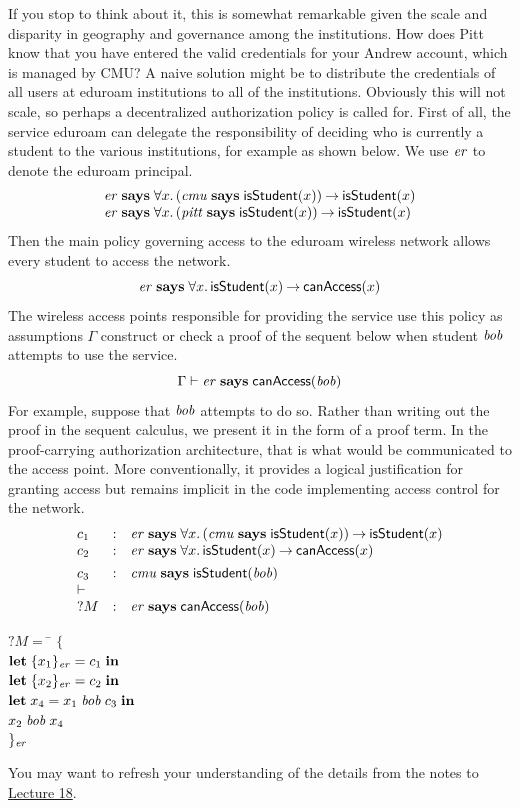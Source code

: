 \documentclass[11pt]{article}
\newcommand{\courseurl}{https://15316-cmu.github.io/2026/}
\begin{document}
If you stop to think about it, this is somewhat remarkable given the scale and
disparity in geography and governance among the institutions. How does Pitt know
that you have entered the valid credentials for your Andrew account, which is
managed by CMU? A naive solution might be to distribute the credentials of
all users at eduroam institutions to all of the institutions. Obviously
this will not scale, so perhaps a decentralized authorization policy is called
for.  First of all, the service eduroam can delegate the responsibility of
deciding who is currently a student to the various institutions, for example as
shown below. We use $\mathit{er}$ to denote the eduroam principal.
\[
  \begin{array}{l}
    \mathit{er} \mathrel{\mathbf{says}} \forall x.\, (\mathit{cmu} \mathrel{\mathbf{says}} \mathsf{isStudent}(x)) \mathbin{\rightarrow} \mathsf{isStudent}(x) \\
    \mathit{er} \mathrel{\mathbf{says}} \forall x.\, (\mathit{pitt} \mathrel{\mathbf{says}} \mathsf{isStudent}(x)) \mathbin{\rightarrow} \mathsf{isStudent}(x)
  \end{array}
\]
Then the main policy governing access to the eduroam wireless network
allows every student to access the network.
\[
  \mathit{er} \mathrel{\mathbf{says}} \forall x.\, \mathsf{isStudent}(x) \mathbin{\rightarrow} \mathsf{canAccess}(x)
\]
The wireless access points responsible for providing the service use this policy
as assumptions $\Gamma$ construct or check a proof of the sequent below when
student $\mathit{bob}$ attempts to use the service.
\[
  \Gamma \vdash \mathit{er} \mathrel{\mathbf{says}} \mathsf{canAccess}(\mathit{bob})
\]
For example, suppose that $\mathit{bob}$ attempts to do so.  Rather than writing
out the proof in the sequent calculus, we present it in the form of a proof term.
In the proof-carrying authorization architecture, that is what would be
communicated to the access point.  More conventionally, it provides a
logical justification for granting access but remains implicit in the code
implementing access control for the network.
\[
  \begin{array}{lcl}
    c_1 & : & \mathit{er} \mathrel{\mathbf{says}} \forall x.\, (\mathit{cmu} \mathrel{\mathbf{says}} \mathsf{isStudent}(x)) \mathbin{\rightarrow} \mathsf{isStudent}(x) \\
    c_2 & : & \mathit{er} \mathrel{\mathbf{says}} \forall x.\, \mathsf{isStudent}(x) \mathbin{\rightarrow} \mathsf{canAccess}(x) \\[1ex]
    c_3 & : & \mathit{cmu} \mathrel{\mathbf{says}} \mathsf{isStudent}(\mathit{bob}) \\
    \vdash \\
    ?M & : & \mathit{er} \mathrel{\mathbf{says}} \mathsf{canAccess}(\mathit{bob})
  \end{array}
\]
\begin{tabbing}
  $?M = $ \= $\{\,$ \= \\
  \>\> $\mathbf{let}\; \{x_1\}_{\mathit{er}} = c_1\; \mathbf{in}$ \\
  \>\> $\mathbf{let}\; \{x_2\}_{\mathit{er}} = c_2\; \mathbf{in}$ \\
  \>\> $\mathbf{let}\; x_4 = x_1\; \mathit{bob}\; c_3\; \mathbf{in}$ \\
  \>\> $x_2\; \mathit{bob}\; x_4$ \\
  \> $\}_{\mathit{er}}$
\end{tabbing}
You may want to refresh your understanding of the details from
the notes to \href{\courseurl/lectures/18-proofrep.pdf}{Lecture 18}.
\end{document}
